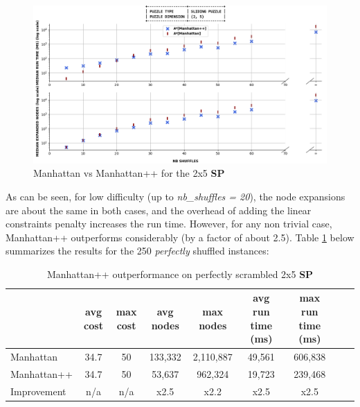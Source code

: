 \begin{figure}[H]
\centering
\includegraphics[scale=0.40]{./Figures/25SPPerformanceManhattan}
\caption[SP]{Manhattan vs Manhattan++ for the 2x5 \textbf{SP}}
\label{fig:25SPPerformanceManhattan}
\end{figure}

As can be seen, for low difficulty (up to \textit{nb\_shuffles = 20}), the node expansions are about the same in both cases, and the overhead of adding the linear constraints penalty increases the run time. However, for any non trivial case, Manhattan++ outperforms considerably (by a factor of about 2.5). Table \ref{tab:mppOutperformance} below summarizes the results for the 250 \textit{perfectly} shuffled instances:



\begin{table}[H]
\begin{center}
\begin{tabular}{l*{7}{c}r}
                              & avg cost  & max cost & avg nodes & max nodes & avg run time (ms) & max run time (ms) \\
\hline
Manhattan                   &  34.7  & 50 & 133,332 & 2,110,887 & 49,561 & 606,838 \\
Manhattan++              & 34.7 &  50 & 53,637 & 962,324 & 19,723 & 239,468 \\
Improvement               & n/a &  n/a & x2.5 & x2.2 & x2.5 & x2.5 \\
\end{tabular}
\caption{\label{tab:mppOutperformance} Manhattan++ outperformance on perfectly scrambled 2x5 \textbf{SP}}
\end{center}
\end{table}







